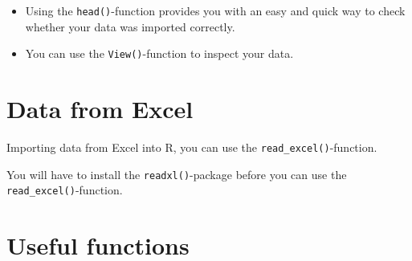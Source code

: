 \documentclass[
  letterpaper,
  DIV=11,
  numbers=noendperiod,
  oneside]{scrreprt}
\providecommand{\tightlist}{%
  \setlength{\itemsep}{0pt}\setlength{\parskip}{0pt}}\usepackage{longtable,booktabs,array}
\begin{document}
\begin{tcolorbox}[enhanced jigsaw, arc=.35mm, left=2mm, breakable, toprule=.15mm, opacityback=0, colframe=quarto-callout-tip-color-frame, colback=white, rightrule=.15mm, bottomrule=.15mm, leftrule=.75mm]
\begin{minipage}[t]{5.5mm}
\textcolor{quarto-callout-tip-color}{\faLightbulb}
\end{minipage}%
\begin{minipage}[t]{\textwidth - 5.5mm}

\begin{itemize}
\tightlist
\item
  Using the \texttt{head()}-function provides you with an easy and quick
  way to check whether your data was imported correctly.
\item
  You can use the \texttt{View()}-function to inspect your data.
\end{itemize}

\end{minipage}%
\end{tcolorbox}

\hypertarget{data-from-excel}{%
\section{Data from Excel}\label{data-from-excel}}

Importing data from Excel into R, you can use the
\texttt{read\_excel()}-function.

\begin{tcolorbox}[enhanced jigsaw, arc=.35mm, left=2mm, breakable, toprule=.15mm, opacityback=0, colframe=quarto-callout-important-color-frame, colback=white, rightrule=.15mm, bottomrule=.15mm, leftrule=.75mm]
\begin{minipage}[t]{5.5mm}
\textcolor{quarto-callout-important-color}{\faExclamation}
\end{minipage}%
\begin{minipage}[t]{\textwidth - 5.5mm}

You will have to install the \texttt{readxl()}-package before you can
use the \texttt{read\_excel()}-function.

\end{minipage}%
\end{tcolorbox}

\hypertarget{useful-functions}{%
\section{Useful functions}\label{useful-functions}}
\end{document}
